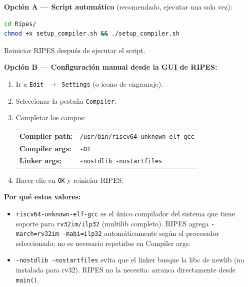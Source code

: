 \documentclass[12pt, a4paper]{article}
\newcommand{\ripesbtn}[1]{\texttt{#1}}
\begin{document}
\begin{ripes}
    \textbf{Opción A — Script automático} (recomendado, ejecutar una sola vez):
\begin{lstlisting}[language=bash, numbers=none]
cd Ripes/
chmod +x setup_compiler.sh && ./setup_compiler.sh
\end{lstlisting}
    Reiniciar RIPES después de ejecutar el script.

    \vspace{0.4cm}
    \textbf{Opción B — Configuración manual desde la GUI de RIPES:}
    \begin{enumerate}
        \item Ir a \ripesbtn{Edit $\to$ Settings} (o ícono de engranaje).
        \item Seleccionar la pestaña \ripesbtn{Compiler}.
        \item Completar los campos:
        \begin{center}
        \renewcommand{\arraystretch}{1.5}
        \begin{tabular}{ll}
            \textbf{Compiler path:}  & \texttt{/usr/bin/riscv64-unknown-elf-gcc} \\
            \textbf{Compiler args:}  & \texttt{-O1} \\
            \textbf{Linker args:}    & \texttt{-nostdlib -nostartfiles} \\
        \end{tabular}
        \end{center}
        \item Hacer clic en \ripesbtn{OK} y reiniciar RIPES.
    \end{enumerate}

    \vspace{0.2cm}
    \textbf{Por qué estos valores:}
    \begin{itemize}
        \item \texttt{riscv64-unknown-elf-gcc} es el único compilador del sistema
              que tiene soporte para \texttt{rv32im/ilp32} (multilib completo).
              RIPES agrega \texttt{-march=rv32im -mabi=ilp32} automáticamente
              según el procesador seleccionado; no es necesario repetirlos en Compiler args.
        \item \texttt{-nostdlib -nostartfiles} evita que el linker busque
              la libc de newlib (no instalada para rv32).
              RIPES no la necesita: arranca directamente desde \texttt{main()}.
    \end{itemize}
\end{ripes}
\end{document}
